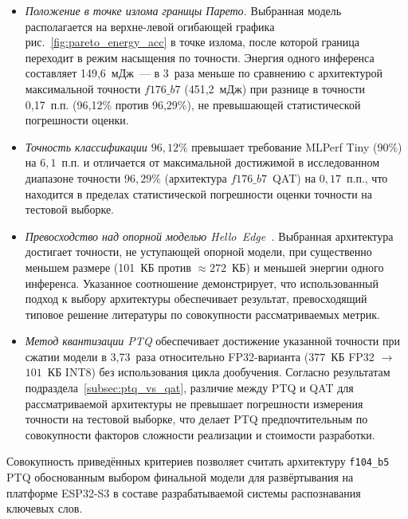 \begin{itemize}
	\item \textit{Положение в точке излома границы Парето.}
	      Выбранная модель располагается на верхне-левой
	      огибающей графика рис.~\ref{fig:pareto_energy_acc} в
	      точке излома, после которой граница переходит в
	      режим насыщения по точности. Энергия одного
	      инференса составляет 149,6~мДж~--- в 3~раза меньше
	      по сравнению с архитектурой максимальной точности
	      $f176\_b7$ (451,2~мДж) при разнице в точности
	      0,17~п.п. (96,12\% против 96,29\%), не превышающей
	      статистической погрешности оценки.

	\item \textit{Точность классификации $96{,}12\%$}
	      превышает требование MLPerf Tiny ($90\%$) на
	      $6{,}1$~п.п. и отличается от максимальной достижимой
	      в исследованном диапазоне точности $96{,}29\%$
	      (архитектура $f176\_b7$~QAT) на $0{,}17$~п.п., что
	      находится в пределах статистической погрешности
	      оценки точности на тестовой выборке.

	\item \textit{Превосходство над опорной моделью
		      Hello~Edge~\cite{src:1}.} Выбранная архитектура
	      достигает точности, не уступающей опорной модели,
	      при существенно меньшем размере (101~КБ против
	      $\approx 272$~КБ) и меньшей энергии одного инференса.
	      Указанное соотношение демонстрирует, что
	      использованный подход к выбору архитектуры
	      обеспечивает результат, превосходящий типовое
	      решение литературы по совокупности рассматриваемых
	      метрик.

	\item \textit{Метод квантизации PTQ} обеспечивает
	      достижение указанной точности при сжатии модели в
	      3,73~раза относительно FP32-варианта ($377$~КБ FP32
	      $\to$ $101$~КБ INT8) без использования цикла
	      дообучения. Согласно результатам подраздела~\ref{subsec:ptq_vs_qat},
	      различие между PTQ и QAT для рассматриваемой
	      архитектуры не превышает погрешности измерения
	      точности на тестовой выборке, что делает PTQ
	      предпочтительным по совокупности факторов
	      сложности реализации и стоимости разработки.
\end{itemize}

Совокупность приведённых критериев позволяет считать
архитектуру \texttt{f104\_b5} PTQ обоснованным выбором
финальной модели для развёртывания на платформе ESP32-S3 в
составе разрабатываемой системы распознавания ключевых слов.

